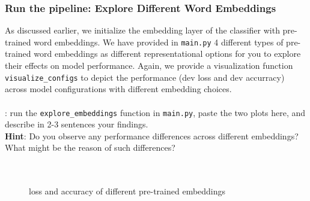    \noindent{}

    \pagebreak
    \subsubsection{Run the pipeline: Explore Different Word Embeddings}
    As discussed earlier, we initialize the embedding layer of the classifier with pre-trained word embeddings. We have provided in \texttt{main.py} 4 different types of pre-trained word embeddings as different representational options for you to explore their effects on model performance. Again, we provide a visualization function \texttt{visualize\_configs} to depict the performance (dev loss and dev accurracy) across model configurations with different embedding choices. \\\\

    \noindent \todo{}: run the \texttt{explore\_embeddings} function in \texttt{main.py}, paste the two plots here, and describe in 2-3 sentences your findings.\\
    \noindent \textbf{Hint}: Do you observe any performance differences across different embeddings? What might be the reason of such differences? 
    \\\\
    \noindent {\color{red}{your plot and answer:}}\\
    \begin{figure}[h] 
       \centering
       \hfill
       \caption{loss and accuracy of different pre-trained embeddings}
    \end{figure}

